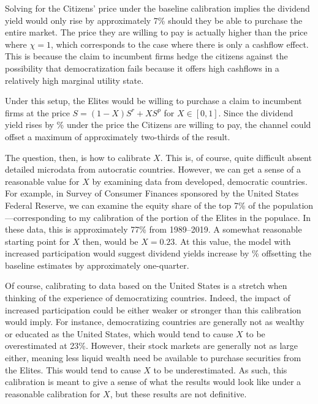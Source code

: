 Solving for the Citizens' price under the baseline calibration implies the dividend yield would only rise by approximately 7\% should they be able to purchase the entire market. The price they are willing to pay is actually higher than the price where $\chi=1$, which corresponds to the case where there is only a cashflow effect. This is because the claim to incumbent firms hedge the citizens against the possibility that democratization fails because it offers high cashflows in a relatively high marginal utility state.

Under this setup, the Elites would be willing to purchase a claim to incumbent firms at the price $S = (1-X) S^r + XS^p$ for $X \in [0,1]$. Since the dividend yield rises by \modelCitizenDY\% under the price the Citizens are willing to pay, the channel could offset a maximum of approximately two-thirds of the result.  

The question, then, is how to calibrate $X$. This is, of course, quite difficult absent detailed microdata from autocratic countries. However, we can get a sense of a reasonable value for $X$ by examining data from developed, democratic countries. For example, in Survey of Consumer Finances sponsored by the United States Federal Reserve, we can examine the equity share of the top 7\% of the population---corresponding to my calibration of the portion of the Elites in the populace. In these data, this is approximately 77\% from 1989--2019. A somewhat reasonable starting point for $X$ then, would be $X = 0.23$. At this value, the model with increased participation would suggest dividend yields increase by \modelLimitedPartDY\% offsetting the baseline estimates by approximately one-quarter.

Of course, calibrating to data based on the United States is a stretch when thinking of the experience of democratizing countries. Indeed, the impact of increased participation could be either weaker or stronger than this calibration would imply. For instance, democratizing countries are generally not as wealthy or educated as the United States, which would tend to cause $X$ to be overestimated at 23\%. However, their stock markets are generally not as large either, meaning less liquid wealth need be available to purchase securities from the Elites. This would tend to cause $X$ to be underestimated. As such, this calibration is meant to give a sense of what the results would look like under a reasonable calibration for $X$, but these results are not definitive.
\label{par:finanace_lib_end}

